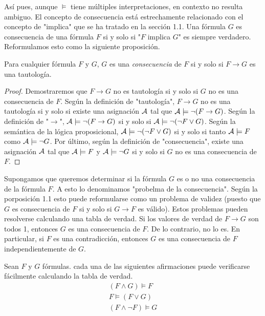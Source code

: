\message{ !name(main.tex)}\documentclass[12pt,a4paper]{book}
\newcommand{\comillas}[1]{"#1"}
\begin{document}
    Así pues, aunque $\models$ tiene múltiples interpretaciones, en contexto no resulta ambiguo. El concepto de consecuencia está estrechamente relacionado con el
    concepto de \comillas{implica} que se ha tratado en la sección 1.1. Una fórmula $G$ es consecuencia de una fórmula $F$ si y solo si \comillas{$F$ implica $G$}
    es siempre verdadero. Reformulamos esto como la siguiente proposición.

    \begin{proposicion}[Consecuencia]
        Para cualquier fórmula $F$ y $G$, $G$ es una \textit{consecuencia} de $F$ si y solo si $F\rightarrow G$ es una tautología.
    \end{proposicion}

    \begin{proof}
        Demostraremos que $F\rightarrow G$ no es tautología si y solo si $G$ no es una consecuencia de $F$.
        Según la definición de \comillas{tautología}, $F\rightarrow G$ no es una tautología si y solo si existe una asignación $\AA$ tal que
        $\AA\models\neg(F\rightarrow G)$. Según la definición de \comillas{$\rightarrow$}, $\AA\models\neg(F\rightarrow G)$ si y solo si $\AA\models \neg(\neg F\vee G)$.
        Según la semántica de la lógica proposicional, $\AA\models\neg(\neg F\vee G)$ si y solo si tanto $\AA\models F$ como $\AA\models\neg G$. Por último, según la definición
        de \comillas{consecuencia}, existe una asignación $\AA$ tal que $\AA\models F$ y $\AA\models\neg G$ si y solo si $G$ no es una consecuencia de $F$.
    \end{proof}

    Supongamos que queremos determinar si la fórmula $G$ es o no una consecuencia de la fórmula $F$. A esto lo denominamos \comillas{probelma de la consecuencia}.
    Según la porposición 1.1 esto puede reformularse como un problema de validez (puesto que $G$ es consecuencia de $F$ si y solo si $G\rightarrow F$ es válido).
    Estos problemas pueden resolverse calculando una tabla de verdad. Si los valores de verdad de $F\rightarrow G$ son todos 1, entonces $G$ es una consecuencia de $F$.
    De lo contrario, no lo es. En particular, si $F$ es una contradicción, entonces $G$ es una consecuencia de $F$ independientemente de $G$.

    \begin{ejemplo}
        Sean $F$ y $G$ fórmulas. cada una de las siguientes afirmaciones puede verificarse fácilmente calculando la tabla de verdad.
        \begin{gather*}
            (F\wedge G)\models F\\
            F\models(F\vee G)\\
            (F\wedge\neg F)\models G
        \end{gather*}
    \end{ejemplo}
\end{document}
